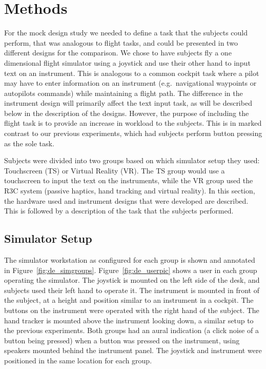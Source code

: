 \section{Methods}

For the mock design study we needed to define a task that the subjects could perform, that was analogous to flight tasks, and could be presented in two different designs for the comparison.
We chose to have subjects fly a one dimensional flight simulator using a joystick and use their other hand to input text on an instrument.
This is analogous to a common cockpit task where a pilot may have to enter information on an instrument (e.g.\ navigational waypoints or autopilots commands) while maintaining a flight path.
The difference in the instrument design will primarily affect the text input task, as will be described below in the description of the designs.
However, the purpose of including the flight task is to provide an increase in workload to the subjects.
This is in marked contrast to our previous experiments, which had subjects perform button pressing as the sole task.

Subjects were divided into two groups based on which simulator setup they used: Touchscreen (TS) or Virtual Reality (VR).
The TS group would use a touchscreen to input the text on the instruments, while the VR group used the R3C system (passive haptics, hand tracking and virtual reality).
In this section, the hardware used and instrument designs that were developed are described.
This is followed by a description of the task that the subjects performed.

\subsection{Simulator Setup}

The simulator workstation as configured for each group is shown and annotated in Figure~\ref{fig:de_simgroups}.
Figure~\ref{fig:de_userpic} shows a user in each group operating the simulator.
The joystick is mounted on the left side of the desk, and subjects used their left hand to operate it.
The instrument is mounted in front of the subject, at a height and position similar to an instrument in a cockpit.
The buttons on the instrument were operated with the right hand of the subject.
The hand tracker is mounted above the instrument looking down, a similar setup to the previous experiments.
Both groups had an aural indication (a click noise of a button being pressed) when a button was pressed on the instrument, using speakers mounted behind the instrument panel.
The joystick and instrument were positioned in the same location for each group.

